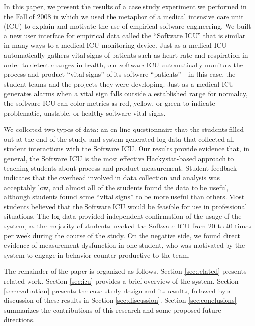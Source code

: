 \documentclass[times,10pt,twocolumn]{article}
\begin{document}
In this paper, we present the results of a case study experiment we
performed in the Fall of 2008 in which we used the metaphor of a medical
intensive care unit (ICU) to explain and motivate the use of empirical
software engineering.  We built a new user interface for empirical data called
the ``Software ICU'' that is similar in many ways to a medical ICU
monitoring device.  Just as a medical ICU automatically gathers vital signs
of patients such as heart rate and respiration in order to detect changes
in health, our software ICU automatically monitors the process and product
``vital signs'' of its software ``patients''---in this case, the student
teams and the projects they were developing.  Just as a medical ICU
generates alarms when a vital sign falls outside a established range for
normalcy, the software ICU can color metrics as red, yellow, or green to
indicate problematic, unstable, or healthy software vital signs.

We collected two types of data: an on-line questionnaire that the students
filled out at the end of the study, and system-generated log data that
collected all student interactions with the Software ICU.  Our results
provide evidence that, in general, the Software ICU is the most effective
Hackystat-based approach to teaching students about process and product
measurement.  Student feedback indicates that the overhead involved in data
collection and analysis was acceptably low, and almost all of the students
found the data to be useful, although students found some ``vital signs''
to be more useful than others. Most students believed that the Software ICU
would be feasible for use in professional situations.  The log data
provided independent confirmation of the usage of the system, as the
majority of students invoked the Software ICU from 20 to 40 times per week
during the course of the study.  On the negative side, we found direct
evidence of measurement dysfunction in one student, who was motivated by the
system to engage in behavior counter-productive to the team.

The remainder of the paper is organized as follows.  Section
\ref{sec:related} presents related work.  Section \ref{sec:icu} provides a
brief overview of the system. Section \ref{sec:evaluation} presents the
case study design and its results, followed by a discussion of these results
in Section \ref{sec:discussion}.   Section \ref{sec:conclusions} summarizes the 
contributions of this research and some proposed future directions.

\label{sec:related}
\end{document}

